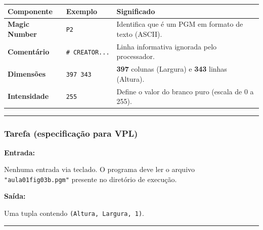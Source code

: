 \documentclass[
  portuguese,
  letterpaper,
  openany,
  oneside,
  12pt,
  a4paper]{book}
\begin{document}
\begin{longtable}[]{@{}
  >{\raggedright\arraybackslash}p{}
  >{\raggedright\arraybackslash}p{}
  >{\raggedright\arraybackslash}p{}@{}}
\toprule\noalign{}
\begin{minipage}[b]{\linewidth}\raggedright
Componente
\end{minipage} & \begin{minipage}[b]{\linewidth}\raggedright
Exemplo
\end{minipage} & \begin{minipage}[b]{\linewidth}\raggedright
Significado
\end{minipage} \\
\midrule\noalign{}
\endhead
\bottomrule\noalign{}
\endlastfoot
\textbf{Magic Number} & \texttt{P2} & Identifica que é um PGM em formato
de texto (ASCII). \\
\textbf{Comentário} & \texttt{\#\ CREATOR...} & Linha informativa
ignorada pelo processador. \\
\textbf{Dimensões} & \texttt{397\ 343} & \textbf{397} colunas (Largura)
e \textbf{343} linhas (Altura). \\
\textbf{Intensidade} & \texttt{255} & Define o valor do branco puro
(escala de 0 a 255). \\
\end{longtable}

\begin{center}\rule{0.5\linewidth}{0.5pt}\end{center}

\subsubsection{\texorpdfstring{ Tarefa (especificação
para
VPL)}{ Tarefa (especificação para VPL)}}\label{tarefa-especificauxe7uxe3o-para-vpl-7}

\textbf{Entrada:}

Nenhuma entrada via teclado. O programa deve ler o arquivo
\texttt{"aula01fig03b.pgm"} presente no diretório de execução.

\textbf{Saída:}

Uma tupla contendo \texttt{(Altura,\ Largura,\ 1)}.

\begin{center}\rule{0.5\linewidth}{0.5pt}\end{center}
\end{document}
